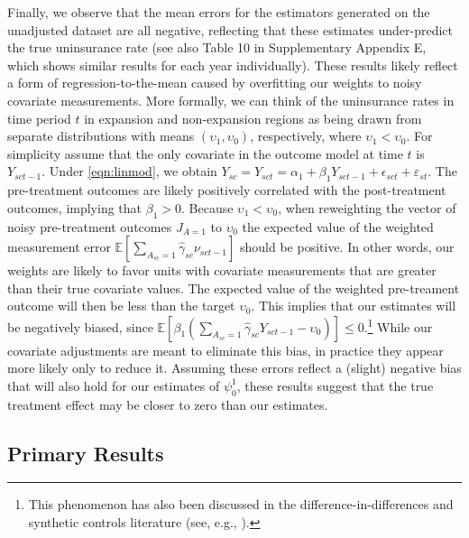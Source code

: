 \documentclass[aoas]{imsart}
\theoremstyle{plain}
\theoremstyle{remark}
\begin{document}
Finally, we observe that the mean errors for the estimators generated on the unadjusted dataset are all negative, reflecting that these estimates under-predict the true uninsurance rate (see also Table 10 in Supplementary Appendix E, which shows similar results for each year individually). These results likely reflect a form of regression-to-the-mean caused by overfitting our weights to noisy covariate measurements. More formally, we can think of the uninsurance rates in time period $t$ in expansion and non-expansion regions as being drawn from separate distributions with means $(\upsilon_1, \upsilon_0)$, respectively, where $\upsilon_1 < \upsilon_0$. For simplicity assume that the only covariate in the outcome model at time $t$ is $Y_{sct-1}$. Under \eqref{eqn:linmod}, we obtain $Y_{sc} = Y_{sct} = \alpha_1 + \beta_1Y_{sct-1} + \epsilon_{sct} + \varepsilon_{st}$. The pre-treatment outcomes are likely positively correlated with the post-treatment outcomes, implying that $\beta_1 > 0$. Because $\upsilon_1 < \upsilon_0$, when reweighting the vector of noisy pre-treatment outcomes $J_{A=1}$ to $\upsilon_0$ the expected value of the weighted measurement error $\mathbb{E}[\sum_{A_{sc} = 1}\hat{\gamma}_{sc}\nu_{sct-1}]$ should be positive. In other words, our weights are likely to favor units with covariate measurements that are greater than their true covariate values. The expected value of the weighted pre-treament outcome will then be less than the target $\upsilon_0$. This implies that our estimates will be negatively biased, since $\mathbb{E}[\beta_1(\sum_{A_{sc} = 1}\hat{\gamma}_{sc}Y_{sct-1} - \upsilon_0)] \le 0$.\footnote{This phenomenon has also been discussed in the difference-in-differences and synthetic controls literature (see, e.g., \citet{daw2018matching}).} While our covariate adjustments are meant to eliminate this bias, in practice they appear more likely only to reduce it. Assuming these errors reflect a (slight) negative bias that will also hold for our estimates of $\psi^1_0$, these results suggest that the true treatment effect may be closer to zero than our estimates. 

\subsection{Primary Results}
\end{document}

